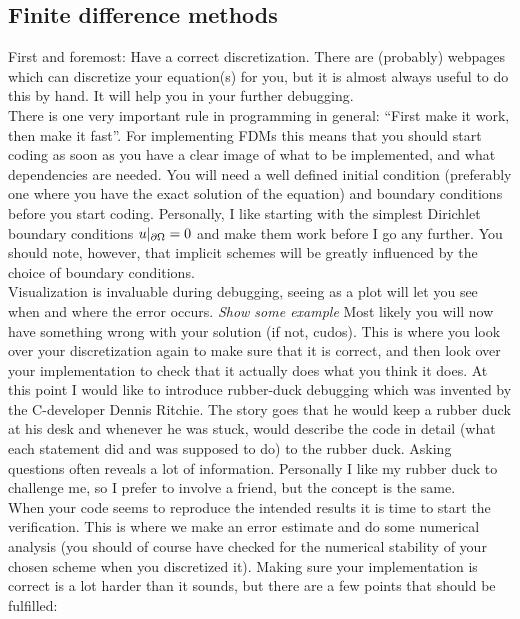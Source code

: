 \subsection{Finite difference methods}
First and foremost: Have a correct discretization. There are (probably) webpages which can discretize your equation(s) for you, but it is almost always useful to do this by hand. 
It will help you in your further debugging. \\
There is one very important rule in programming in general: ``First make it work, then make it fast''. 
For implementing FDMs this means that you should start coding as soon as you have a clear image of what to be implemented, and what dependencies are needed. You will need a well defined initial condition (preferably one where you have the exact solution of the equation) and boundary conditions before you start coding. 
Personally, I like starting with the simplest Dirichlet boundary conditions $u|_{\partial \Omega} = 0$ and make them work before I go any further. 
You should note, however, that implicit schemes will be greatly influenced by the choice of boundary conditions.\\
Visualization is invaluable during debugging, seeing as a plot will let you see when and where the error occurs. \emph{Show some example}
Most likely you will now have something wrong with your solution (if not, cudos). This is where you look over your discretization again to make sure that it is correct, and then look over your implementation to check that it actually does what you think it does. 
At this point I would like to introduce rubber-duck debugging which was invented by the C-developer Dennis Ritchie. 
The story goes that he would keep a rubber duck at his desk and whenever he was stuck, would describe the code in detail (what each statement did and was supposed to do) to the rubber duck. Asking questions often reveals a lot of information. 
Personally I like my rubber duck to challenge me, so I prefer to involve a friend, but the concept is the same.\\
When your code seems to reproduce the intended results it is time to start the verification. This is where we make an error estimate and do some numerical analysis (you should of course have checked for the numerical stability of your chosen scheme when you discretized it). 
Making sure your implementation is correct is a lot harder than it sounds, but there are a few points that should be fulfilled:
